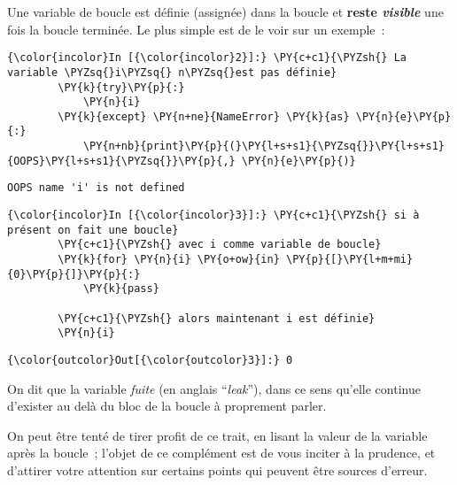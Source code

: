     Une variable de boucle est définie (assignée) dans la boucle et
\textbf{reste \emph{visible}} une fois la boucle terminée. Le plus
simple est de le voir sur un exemple~:

    \begin{Verbatim}[commandchars=\\\{\},frame=single,framerule=0.3mm,rulecolor=\color{cellframecolor}]
{\color{incolor}In [{\color{incolor}2}]:} \PY{c+c1}{\PYZsh{} La variable \PYZsq{}i\PYZsq{} n\PYZsq{}est pas définie}
        \PY{k}{try}\PY{p}{:}
            \PY{n}{i}
        \PY{k}{except} \PY{n+ne}{NameError} \PY{k}{as} \PY{n}{e}\PY{p}{:}
            \PY{n+nb}{print}\PY{p}{(}\PY{l+s+s1}{\PYZsq{}}\PY{l+s+s1}{OOPS}\PY{l+s+s1}{\PYZsq{}}\PY{p}{,} \PY{n}{e}\PY{p}{)}
\end{Verbatim}


    \begin{Verbatim}[commandchars=\\\{\},frame=single,framerule=0.3mm,rulecolor=\color{cellframecolor}]
OOPS name 'i' is not defined
\end{Verbatim}

    \begin{Verbatim}[commandchars=\\\{\},frame=single,framerule=0.3mm,rulecolor=\color{cellframecolor}]
{\color{incolor}In [{\color{incolor}3}]:} \PY{c+c1}{\PYZsh{} si à présent on fait une boucle}
        \PY{c+c1}{\PYZsh{} avec i comme variable de boucle}
        \PY{k}{for} \PY{n}{i} \PY{o+ow}{in} \PY{p}{[}\PY{l+m+mi}{0}\PY{p}{]}\PY{p}{:}
            \PY{k}{pass}
        
        \PY{c+c1}{\PYZsh{} alors maintenant i est définie}
        \PY{n}{i}
\end{Verbatim}


\begin{Verbatim}[commandchars=\\\{\},frame=single,framerule=0.3mm,rulecolor=\color{cellframecolor}]
{\color{outcolor}Out[{\color{outcolor}3}]:} 0
\end{Verbatim}
            
    On dit que la variable \emph{fuite} (en anglais ``\emph{leak}''), dans
ce sens qu'elle continue d'exister au delà du bloc de la boucle à
proprement parler.

    On peut être tenté de tirer profit de ce trait, en lisant la valeur de
la variable après la boucle~; l'objet de ce complément est de vous
inciter à la prudence, et d'attirer votre attention sur certains points
qui peuvent être sources d'erreur.


